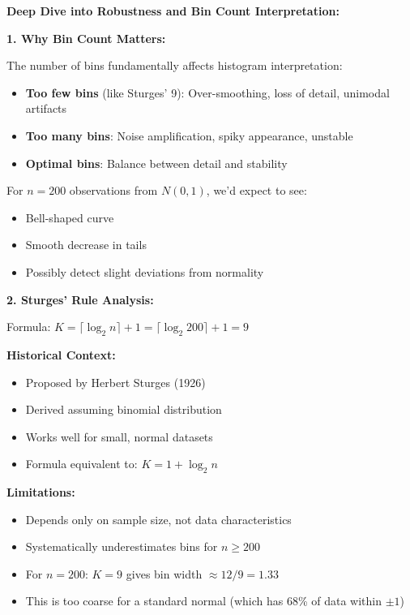\documentclass[12pt]{article}
\begin{document}
\begin{explanation}
\textbf{Deep Dive into Robustness and Bin Count Interpretation:}

\textbf{1. Why Bin Count Matters:}

The number of bins fundamentally affects histogram interpretation:

\begin{itemize}
    \item \textbf{Too few bins} (like Sturges' 9): Over-smoothing, loss of detail, unimodal artifacts
    \item \textbf{Too many bins}: Noise amplification, spiky appearance, unstable
    \item \textbf{Optimal bins}: Balance between detail and stability
\end{itemize}

For \(n = 200\) observations from \(N(0,1)\), we'd expect to see:
\begin{itemize}
    \item Bell-shaped curve
    \item Smooth decrease in tails
    \item Possibly detect slight deviations from normality
\end{itemize}

\textbf{2. Sturges' Rule Analysis:}

Formula: \(K = \lceil\log_2 n\rceil + 1 = \lceil\log_2 200\rceil + 1 = 9\)

\textbf{Historical Context:}
\begin{itemize}
    \item Proposed by Herbert Sturges (1926)
    \item Derived assuming binomial distribution
    \item Works well for small, normal datasets
    \item Formula equivalent to: \(K = 1 + \log_2 n\)
\end{itemize}

\textbf{Limitations:}
\begin{itemize}
    \item Depends only on sample size, not data characteristics
    \item Systematically underestimates bins for \(n \geq 200\)
    \item For \(n = 200\): \(K = 9\) gives bin width \(\approx 12/9 = 1.33\)
    \item This is too coarse for a standard normal (which has 68\% of data within \(\pm 1\))
\end{itemize}


\end{explanation}
\end{document}
